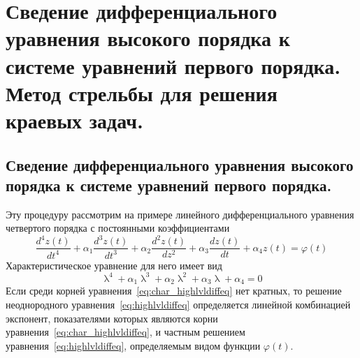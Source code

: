 \documentclass[../../calc-math-exam-2023.tex]{subfiles}
\begin{document}
    \section{Сведение дифференциального уравнения высокого порядка к системе уравнений первого порядка. Метод стрельбы для решения краевых задач.}\label{sec:ch29}

    \subsection{Сведение дифференциального уравнения высокого порядка к системе уравнений первого порядка.}
    Эту процедуру рассмотрим на примере линейного дифференциального уравнения четвертого порядка с постоянными
    коэффициентами
    \begin{equation}
        \frac{d^4 z(t)}{dt^4} + \alpha_1\frac{d^3 z(t)}{dt^3} + \alpha_2\frac{d^2 z(t)}{dz^2} + \alpha_3\frac{dz(t)}{dt} + \alpha_4 z(t) = \varphi(t)
        \label{eq:highlvldiffeq}
    \end{equation}
    Характеристическое уравнение для него имеет вид
    \begin{equation}
        \uplambda^4 + \alpha_1 \uplambda^3 + \alpha_2 \uplambda^2 + \alpha_3 \uplambda + \alpha_4 = 0
        \label{eq:char_highlvldiffeq}
    \end{equation}
    Если среди корней уравнения~\eqref{eq:char_highlvldiffeq} нет кратных, то решение неоднородного уравнения~\eqref{eq:highlvldiffeq}
    определяется линейной комбинацией экспонент, показателями которых являются корни уравнения~\eqref{eq:char_highlvldiffeq},
    и частным решением уравнения~\eqref{eq:highlvldiffeq}, определяемым видом функции $\varphi(t)$.
\end{document}

